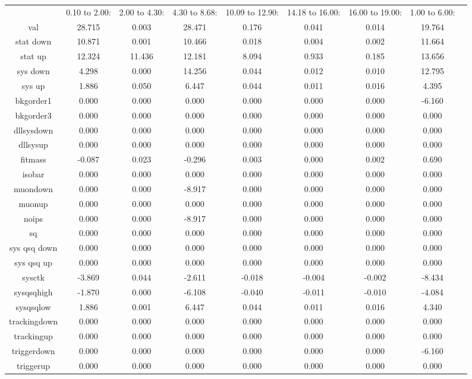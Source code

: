 \begin{table}[tbp]
\begin{tabular}{|c|c|c|c|c|c|c|c|c|}
\hline
 & 0.10 to  2.00: & 2.00 to  4.30: & 4.30 to  8.68: & 10.09 to  12.90: & 14.18 to  16.00: & 16.00 to  19.00: & 1.00 to  6.00:\\ 
val & 28.715 & 0.003 & 28.471 & 0.176 & 0.041 & 0.014 & 19.764\\ 
stat down & 10.871 & 0.001 & 10.466 & 0.018 & 0.004 & 0.002 & 11.664\\ 
stat up & 12.324 & 11.436 & 12.181 & 8.094 & 0.933 & 0.185 & 13.656\\ 
sys down & 4.298 & 0.000 & 14.256 & 0.044 & 0.012 & 0.010 & 12.795\\ 
sys up & 1.886 & 0.050 & 6.447 & 0.044 & 0.011 & 0.016 & 4.395\\ 
bkgorder1 & 0.000 & 0.000 & 0.000 & 0.000 & 0.000 & 0.000 & -6.160\\ 
bkgorder3 & 0.000 & 0.000 & 0.000 & 0.000 & 0.000 & 0.000 & 0.000\\ 
dllsysdown & 0.000 & 0.000 & 0.000 & 0.000 & 0.000 & 0.000 & 0.000\\ 
dllsysup & 0.000 & 0.000 & 0.000 & 0.000 & 0.000 & 0.000 & 0.000\\ 
fitmass & -0.087 & 0.023 & -0.296 & 0.003 & 0.000 & 0.002 & 0.690\\ 
isobar & 0.000 & 0.000 & 0.000 & 0.000 & 0.000 & 0.000 & 0.000\\ 
muondown & 0.000 & 0.000 & -8.917 & 0.000 & 0.000 & 0.000 & 0.000\\ 
muonup & 0.000 & 0.000 & 0.000 & 0.000 & 0.000 & 0.000 & 0.000\\ 
noips & 0.000 & 0.000 & -8.917 & 0.000 & 0.000 & 0.000 & 0.000\\ 
sq & 0.000 & 0.000 & 0.000 & 0.000 & 0.000 & 0.000 & 0.000\\ 
sys qsq down & 0.000 & 0.000 & 0.000 & 0.000 & 0.000 & 0.000 & 0.000\\ 
sys qsq up & 0.000 & 0.000 & 0.000 & 0.000 & 0.000 & 0.000 & 0.000\\ 
sysctk & -3.869 & 0.044 & -2.611 & -0.018 & -0.004 & -0.002 & -8.434\\ 
sysqsqhigh & -1.870 & 0.000 & -6.108 & -0.040 & -0.011 & -0.010 & -4.084\\ 
sysqsqlow & 1.886 & 0.001 & 6.447 & 0.044 & 0.011 & 0.016 & 4.340\\ 
trackingdown & 0.000 & 0.000 & 0.000 & 0.000 & 0.000 & 0.000 & 0.000\\ 
trackingup & 0.000 & 0.000 & 0.000 & 0.000 & 0.000 & 0.000 & 0.000\\ 
triggerdown & 0.000 & 0.000 & 0.000 & 0.000 & 0.000 & 0.000 & -6.160\\ 
triggerup & 0.000 & 0.000 & 0.000 & 0.000 & 0.000 & 0.000 & 0.000\\ 
\hline
\end{tabular}
\end{table}

